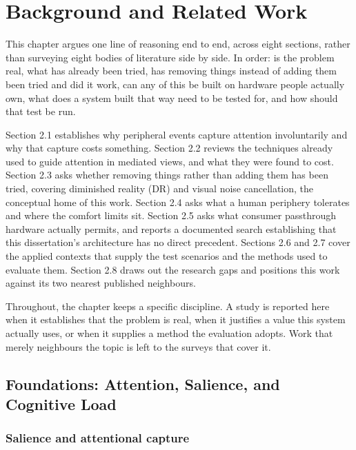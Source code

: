 \chapter{Background and Related Work}

This chapter argues one line of reasoning end to end, across eight sections, rather than
surveying eight bodies of literature side by side. In order: is the problem real, what has
already been tried, has removing things instead of adding them been tried and did it work,
can any of this be built on hardware people actually own, what does a system built that way
need to be tested for, and how should that test be run.

Section 2.1 establishes why peripheral events capture attention involuntarily and why that capture
costs something. Section 2.2 reviews the techniques already used to guide attention in mediated
views, and what they were found to cost. Section 2.3 asks whether removing things rather than adding
them has been tried, covering diminished reality (DR) and visual noise cancellation, the conceptual
home of this work. Section 2.4 asks what a human periphery tolerates and where the comfort limits
sit. Section 2.5 asks what consumer passthrough hardware actually permits, and reports a documented
search establishing that this dissertation's architecture has no direct precedent. Sections 2.6 and
2.7 cover the applied contexts that supply the test scenarios and the methods used to evaluate them.
Section 2.8 draws out the research gaps and positions this work against its two nearest published
neighbours.

Throughout, the chapter keeps a specific discipline. A study is reported here when it establishes
that the problem is real, when it justifies a value this system actually uses, or when it supplies a
method the evaluation adopts. Work that merely neighbours the topic is left to the surveys that cover
it.

\section{Foundations: Attention, Salience, and Cognitive Load}

\subsection{Salience and attentional capture}

